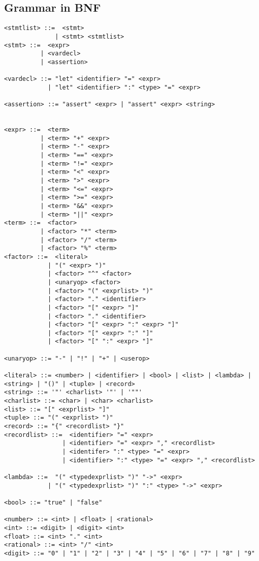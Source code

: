 \subsection{Grammar in BNF}\label{subsec:grammar-in-bnf8}

\begin{verbatim}
<stmtlist> ::=  <stmt> 
              | <stmt> <stmtlist>
<stmt> ::=  <expr> 
          | <vardecl>
          | <assertion>
          
<vardecl> ::= "let" <identifier> "=" <expr>
            | "let" <identifier> ":" <type> "=" <expr>
            
<assertion> ::= "assert" <expr> | "assert" <expr> <string>
                

<expr> ::=  <term> 
          | <term> "+" <expr> 
          | <term> "-" <expr>
          | <term> "==" <expr>
          | <term> "!=" <expr>
          | <term> "<" <expr>
          | <term> ">" <expr>
          | <term> "<=" <expr>
          | <term> ">=" <expr>
          | <term> "&&" <expr>
          | <term> "||" <expr>
<term> ::=  <factor> 
          | <factor> "*" <term> 
          | <factor> "/" <term> 
          | <factor> "%" <term> 
<factor> ::=  <literal> 
            | "(" <expr> ")" 
            | <factor> "^" <factor>
            | <unaryop> <factor>
            | <factor> "(" <exprlist> ")"
            | <factor> "." <identifier>
            | <factor> "[" <expr> "]"
            | <factor> "." <identifier>
            | <factor> "[" <expr> ":" <expr> "]"
            | <factor> "[" <expr> ":" "]"
            | <factor> "[" ":" <expr> "]"

<unaryop> ::= "-" | "!" | "+" | <userop>

<literal> ::= <number> | <identifier> | <bool> | <list> | <lambda> | <string> | "()" | <tuple> | <record>
<string> ::= '"' <charlist> '"' | '""'
<charlist> ::= <char> | <char> <charlist>
<list> ::= "[" <exprlist> "]"
<tuple> ::= "(" <exprlist> ")"
<record> ::= "{" <recordlist> "}"
<recordlist> ::=  <identifier> "=" <expr> 
                | <identifier> "=" <expr> "," <recordlist>
                | <identifer> ":" <type> "=" <expr> 
                | <identifier> ":" <type> "=" <expr> "," <recordlist>
            
<lambda> ::=  "(" <typedexprlist> ")" "->" <expr>
            | "(" <typedexprlist> ")" ":" <type> "->" <expr>

<bool> ::= "true" | "false"
            
<number> ::= <int> | <float> | <rational>
<int> ::= <digit> | <digit> <int>
<float> ::= <int> "." <int>
<rational> ::= <int> "/" <int>
<digit> ::= "0" | "1" | "2" | "3" | "4" | "5" | "6" | "7" | "8" | "9"


\end{verbatim}
